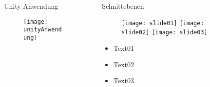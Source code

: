 \begin{frame}[t]
\begin{columns}[t]
\begin{column}{.025\textwidth}\end{column} %

\begin{column}{.465\textwidth} %


\begin{block}{Unity Anwendung}
    \begin{figure}
    	\center
        \texttt{[image: unityAnwendung]}
        
    \end{figure}

\end{block}


\end{column} %



\begin{column}{.025\textwidth}\end{column} %

\begin{column}{.465\textwidth}

\begin{block}{Schnittebenen}

   \begin{figure}
       \texttt{[image: slide01]}
       \vspace{10px}
       \texttt{[image: slide02]}
       \vspace{10px}
       \texttt{[image: slide03]}
   \end{figure}
%   
%   
%   
%   
%   
   \begin{itemize}
   \item Text01
   \item Text02
   \item Text03
   \end{itemize}
   

\end{block}
\end{column}
\end{columns}
\end{frame}
